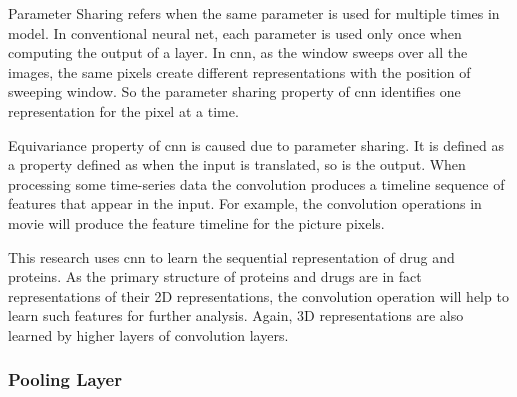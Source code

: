   Parameter Sharing refers when the same parameter is used for multiple times in model. In conventional neural net, each parameter is used only once when computing the output of a layer. In \acrshort{cnn}, as the window sweeps over all the images, the same pixels create different representations with the position of sweeping window. So the parameter sharing property of \acrshort{cnn} identifies one representation for the pixel at a time.
  
  Equivariance property of \acrshort{cnn} is caused due to parameter sharing. It is defined as a property defined as when the input is translated, so is the output. When processing some time-series data the convolution produces a timeline sequence of features that appear in the input. For example, the convolution operations in movie will produce the feature timeline for the picture pixels.

  This research uses \acrfull{cnn} to learn the sequential representation of drug and proteins. As the primary structure of proteins and drugs are in fact representations of their 2D representations, the convolution operation will help to learn such features for further analysis. Again, 3D representations are also learned by higher layers of convolution layers. \citep{Adhikari2017}

  
  
  \subsubsection{Pooling Layer}

